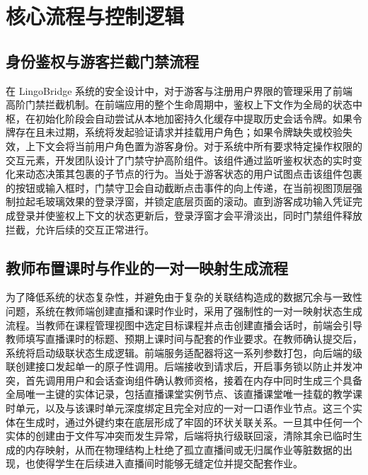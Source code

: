 \chapter{核心流程与控制逻辑}

\section{身份鉴权与游客拦截门禁流程}
在 LingoBridge 系统的安全设计中，对于游客与注册用户界限的管理采用了前端高阶门禁拦截机制。在前端应用的整个生命周期中，鉴权上下文作为全局的状态中枢，在初始化阶段会自动尝试从本地加密持久化缓存中提取历史会话令牌。如果令牌存在且未过期，系统将发起验证请求并挂载用户角色；如果令牌缺失或校验失效，上下文会将当前用户角色置为游客身份。对于系统中所有要求特定操作权限的交互元素，开发团队设计了门禁守护高阶组件。该组件通过监听鉴权状态的实时变化来动态决策其包裹的子节点的行为。当处于游客状态的用户试图点击该组件包裹的按钮或输入框时，门禁守卫会自动截断点击事件的向上传递，在当前视图顶层强制拉起毛玻璃效果的登录浮窗，并锁定底层页面的滚动。直到游客成功输入凭证完成登录并使鉴权上下文的状态更新后，登录浮窗才会平滑淡出，同时门禁组件释放拦截，允许后续的交互正常进行。

\section{教师布置课时与作业的一对一映射生成流程}
为了降低系统的状态复杂性，并避免由于复杂的关联结构造成的数据冗余与一致性问题，系统在教师端创建直播和课时作业时，采用了强制性的一对一映射状态生成流程。当教师在课程管理视图中选定目标课程并点击创建直播会话时，前端会引导教师填写直播课时的标题、预期上课时间与配套的作业要求。在教师确认提交后，系统将启动级联状态生成逻辑。前端服务适配器将这一系列参数打包，向后端的级联创建接口发起单一的原子性调用。后端接收到请求后，开启事务锁以防止并发冲突，首先调用用户和会话查询组件确认教师资格，接着在内存中同时生成三个具备全局唯一主键的实体记录，包括直播课堂实例节点、该直播课堂唯一挂载的教学课时单元，以及与该课时单元深度绑定且完全对应的一对一口语作业节点。这三个实体在生成时，通过外键约束在底层形成了牢固的环状关联关系。一旦其中任何一个实体的创建由于文件写冲突而发生异常，后端将执行级联回滚，清除其余已临时生成的内存映射，从而在物理结构上杜绝了孤立直播间或无归属作业等脏数据的出现，也使得学生在后续进入直播间时能够无缝定位并提交配套作业。

